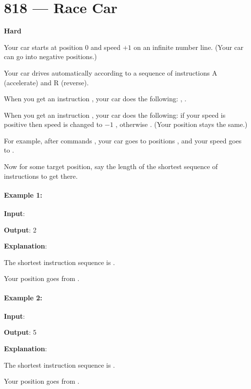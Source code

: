\section{818 --- Race Car}

\textbf{Hard}

Your car starts at position 0 and speed $+1$ on an infinite number line.  (Your car can go into negative positions.)

Your car drives automatically according to a sequence of instructions A (accelerate) and R (reverse).

When you get an instruction , your car does the following: , .

When you get an instruction , your car does the following: if your speed is positive then speed is changed to $-1$ , otherwise .  (Your position stays the same.)

For example, after commands , your car goes to positions , and your speed goes to .

Now for some target position, say the length of the shortest sequence of instructions to get there.

\paragraph{Example 1:}

\begin{flushleft}
\textbf{Input}: 


\textbf{Output}: 2

\textbf{Explanation}: 

The shortest instruction sequence is .

Your position goes from .
\end{flushleft}

\paragraph{Example 2:}

\begin{flushleft}
\textbf{Input}: 


\textbf{Output}: 5

\textbf{Explanation}: 

The shortest instruction sequence is .

Your position goes from .
\end{flushleft}
 

